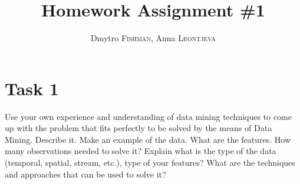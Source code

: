 \documentclass{article}
\title{Homework Assignment \#1} %
\author{Dmytro \textsc{Fishman}, Anna \textsc{Leontjeva}} %
\begin{document}
\maketitle %
\section{Task 1}
Use your own experience and understanding of data mining techniques to come up with the problem that fits perfectly to be solved by the means of Data Mining. Describe it. Make an example of the data. What are the features. How many observations needed to solve it? Explain what is the type of the data (temporal, spatial, stream, etc.), type of your features? What are the techniques and approaches that can be used to solve it?  
\end{document}
